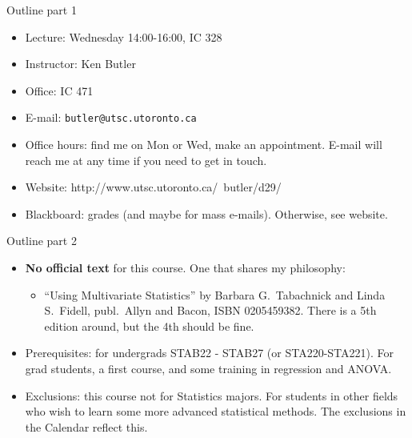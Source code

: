 \documentclass[hyperref={pdfpagelabels=false}]{beamer}
\begin{document}
\begin{frame}{Outline part 1}
\begin{itemize}
    \item  Lecture: Wednesday 14:00-16:00, IC 328
    \item  Instructor: Ken Butler
    \item  Office: IC 471
    \item  E-mail: \verb-butler@utsc.utoronto.ca-
    \item  Office hours: find me on Mon or Wed, make an appointment. E-mail will reach me at any time if you need to get in touch.
    \item Website: http://www.utsc.utoronto.ca/~butler/d29/
    \item Blackboard: grades (and maybe for mass e-mails). Otherwise,
      see website.
\end{itemize}
\end{frame}

\begin{frame}{Outline part 2}
\begin{itemize}
    \item {\bf No official text} for this course. One that shares my philosophy:
      \begin{itemize}
      \item ``Using Multivariate Statistics'' by Barbara G.\ Tabachnick and Linda S.\ Fidell, publ.\ Allyn and Bacon, ISBN 0205459382. There is a 5th edition around, but the 4th should be fine.
      \end{itemize}

    \item Prerequisites: for undergrads STAB22 - STAB27
      (or STA220-STA221). For grad students,
      a first course, and some training in
      regression and ANOVA.
    \item  Exclusions: this course not for Statistics majors. For students in other fields who wish to learn some more advanced statistical methods. The exclusions in the Calendar reflect this.
\end{itemize}
\end{frame}
\end{document}
